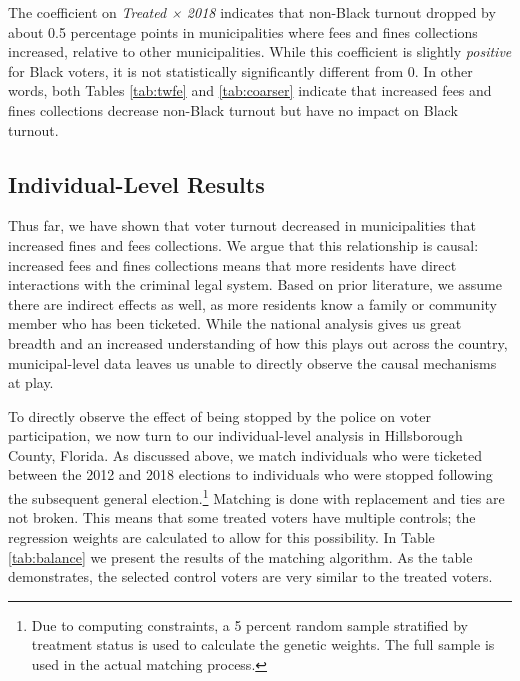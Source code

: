 \documentclass[
  12pt,
]{article}
\begin{document}
The coefficient on \emph{Treated × 2018} indicates that non-Black turnout dropped by about 0.5 percentage points in municipalities where fees and fines collections increased, relative to other municipalities. While this coefficient is slightly \emph{positive} for Black voters, it is not statistically significantly different from 0. In other words, both Tables \ref{tab:twfe} and \ref{tab:coarser} indicate that increased fees and fines collections decrease non-Black turnout but have no impact on Black turnout.

\hypertarget{individual-level-results}{%
\subsection*{Individual-Level Results}\label{individual-level-results}}

Thus far, we have shown that voter turnout decreased in municipalities that increased fines and fees collections. We argue that this relationship is causal: increased fees and fines collections means that more residents have direct interactions with the criminal legal system. Based on prior literature, we assume there are indirect effects as well, as more residents know a family or community member who has been ticketed. While the national analysis gives us great breadth and an increased understanding of how this plays out across the country, municipal-level data leaves us unable to directly observe the causal mechanisms at play.

To directly observe the effect of being stopped by the police on voter participation, we now turn to our individual-level analysis in Hillsborough County, Florida. As discussed above, we match individuals who were ticketed between the 2012 and 2018 elections to individuals who were stopped following the subsequent general election.\footnote{Due to computing constraints, a 5 percent random sample stratified by treatment status is used to calculate the genetic weights. The full sample is used in the actual matching process.} Matching is done with replacement and ties are not broken. This means that some treated voters have multiple controls; the regression weights are calculated to allow for this possibility. In Table \ref{tab:balance} we present the results of the matching algorithm. As the table demonstrates, the selected control voters are very similar to the treated voters.
\end{document}
